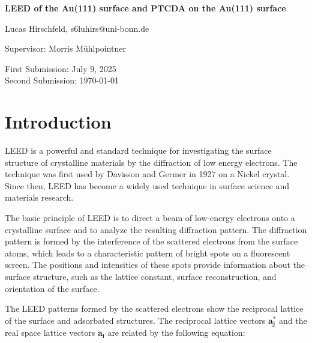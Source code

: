 \documentclass[fontsize=11pt,reqno,a4paper,oneside]{scrartcl}
\makeatletter
\def\Autor{Lucas Hirschfeld, s6luhirs@uni-bonn.de}
\def\Titel{\Acl{LEED} of the Au(111) surface and \acs{PTCDA} on the Au(111) surface}
\def\Date{First Submission: July 9, 2025 \\ Second Submission: \today}
\def\PiC{Supervisor: Morris Mühlpointner}
\def\Abstract{}
\makeatother
\begin{document}
\pagestyle{empty}
\begin{titlepage}
    \begin{center}
        \vspace*{\fill}
        {\LARGE\bfseries \Titel}\par\vspace{2cm}
        {\Autor\par\vspace{0.5cm}\PiC\par\vspace{1cm}\par\vspace{0.2cm}\Date\par\vspace{5cm}}
    \end{center}
    {\Abstract\vspace{0.5cm}\par}\vfill
\end{titlepage}

\pagestyle{scrheadings}
\tableofcontents
{}
\clearpage

\section{Introduction}

\Acl{LEED} is a powerful and standard technique for investigating the surface structure of crystalline materials by the diffraction of low energy electrons. The technique was first used by Davisson and Germer in 1927 on a Nickel crystal.\autocite{Davisson1927} Since then, \ac{LEED} has become a widely used technique in surface science and materials research.\autocite{Kolasinski2012}

The basic principle of \ac{LEED} is to direct a beam of low-energy electrons onto a crystalline surface and to analyze the resulting diffraction pattern. The diffraction pattern is formed by the interference of the scattered electrons from the surface atoms, which leads to a characteristic pattern of bright spots on a fluorescent screen. The positions and intensities of these spots provide information about the surface structure, such as the lattice constant, surface reconstruction, and orientation of the surface.\autocite{Kolasinski2012}

The \ac{LEED} patterns formed by the scattered electrons show the reciprocal lattice of the surface and adsorbated structures. The reciprocal lattice vectors $\mathbf{a_j^*}$ and the real space lattice vectors $\mathbf{a_i}$ are related by the following equation:
\end{document}
